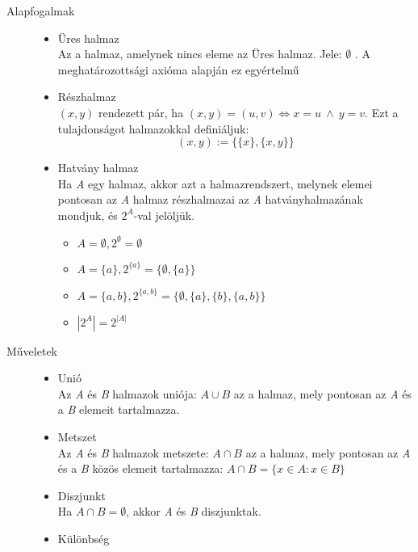 \documentclass[margin=0px]{article}
\begin{document}
\begin{description}
    \item[Alapfogalmak] \hfill
        \begin{itemize}
            \item Üres halmaz \\
                  Az a halmaz, amelynek nincs eleme az Üres halmaz. Jele: $\emptyset$ . A meghatározottsági axióma alapján ez egyértelmű
            \item Részhalmaz \\
                  $(x,y)$ rendezett pár, ha $(x,y) = (u,v) \Longleftrightarrow x = u \ \land \ y = v$. Ezt a tulajdonságot halmazokkal definiáljuk:
                  \[ (x,y) := \{ \{x\}, \{x, y\} \} \]
            \item Hatvány halmaz \\
                  Ha {\it A} egy halmaz, akkor azt a halmazrendszert, melynek elemei pontosan az {\it A} halmaz részhalmazai az {\it A} hatványhalmazának mondjuk, és $2^A$-val jelöljük.
                  \begin{itemize}
                      \item $A = \emptyset , 2^\emptyset = {\emptyset}$
                      \item $A = \{a\} , 2^{\{a\}} = \{\emptyset, \{a\}\}$
                      \item $A = \{a, b\} , 2^{\{a,b\}} = \{\emptyset, \{a\}, \{b\}, \{a, b\}\}$
                      \item $|2^A| = 2^{|A|}$
                  \end{itemize}
        \end{itemize}
    \item[Műveletek] \hfill
        \begin{itemize}
            \item Unió \\
                  Az {\it A} és {\it B} halmazok uniója: $A \cup B$ az a halmaz, mely pontosan az {\it A} és a {\it B} elemeit tartalmazza.
            \item Metszet \\
                  Az {\it A} és {\it B} halmazok metszete: $A \cap B$ az a halmaz, mely pontosan az {\it A} és a {\it B} közös elemeit tartalmazza: $A \cap B = \{ x \in A : x \in B \}$
            \item Diszjunkt \\
                  Ha $A \cap B = \emptyset$, akkor {\it A} és {\it B} diszjunktak.
            \item Különbség \\

\end{itemize}
\end{description}
\end{document}
